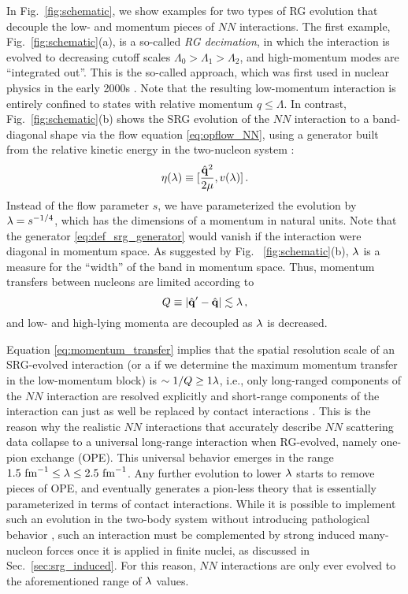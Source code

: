 {In Fig.~\ref{fig:schematic}, we show examples for two types of RG evolution
that decouple the low- and momentum pieces of $NN$ interactions. The first
example, Fig.~\ref{fig:schematic}(a), is a so-called  \emph{RG decimation}, 
in which the interaction is evolved to decreasing cutoff scales $\Lambda_0 > \Lambda_1 > \Lambda_2$, 
and high-momentum modes are ``integrated out''. This is the so-called \Vlowk{}
approach, which was first used in nuclear physics in the early 2000s 
\cite{Bogner:2003os,Bogner:2010pq}. Note that the resulting low-momentum 
interaction is entirely confined to states with relative momentum $q\leq\Lambda$.
In contrast, Fig.~\ref{fig:schematic}(b) shows the SRG evolution of the $NN$ interaction
to a band-diagonal shape via the flow equation \eqref{eq:opflow_NN}, using a 
generator built from the relative kinetic energy in the two-nucleon system \cite{Bogner:2007od,Bogner:2010pq}:
\begin{equation}\label{eq:def_srg_generator}
  \eta(\lambda) \equiv \comm{\frac{\qOV^2}{2\mu}}{v(\lambda)}\,.
\end{equation}
Instead of the flow parameter $s$, we have parameterized the evolution by 
$\lambda=s^{-1/4}$, which has the dimensions of a momentum in natural units. 
Note that the generator \eqref{eq:def_srg_generator} would vanish if the
interaction were diagonal in momentum space. As suggested by Fig.~
\ref{fig:schematic}(b), $\lambda$ is a measure for the ``width'' of the 
band in momentum space. Thus, momentum transfers between nucleons are limited 
according to
\begin{equation}\label{eq:momentum_transfer}
  Q\equiv |\qOV' - \qOV| \lesssim \lambdaSRG\,,
\end{equation} 
and low- and high-lying momenta are decoupled as $\lambda$ is decreased. 

Equation \eqref{eq:momentum_transfer} implies that the spatial resolution scale
of an SRG-evolved interaction (or a \Vlowk{} if we determine the maximum
momentum transfer in the low-momentum block) is $\sim 1/Q \geq 1\lambda$,
i.e., only long-ranged components of the $NN$ interaction are resolved explicitly
and short-range components of the interaction can just as well be replaced 
by contact interactions \cite{Lepage:1997py,Bogner:2003os,Holt:2004ux,Bogner:2010pq}.
This is the reason why the realistic $NN$ interactions that accurately 
describe $NN$ scattering data collapse to a universal long-range interaction
when RG-evolved, namely one-pion exchange (OPE). This universal behavior emerges
in the range $1.5\,\,\text{fm}^{-1}\leq\lambda\leq2.5\,\,\text{fm}^{-1}$. Any further evolution to
lower $\lambda$ starts to remove pieces of OPE, and eventually generates a 
pion-less theory that is essentially parameterized in terms of contact 
interactions. While it is possible to implement such an evolution in
the two-body system without introducing pathological behavior \cite{Wendt:2011ys},
such an interaction must be complemented by strong induced many-nucleon
forces once it is applied in finite nuclei, as discussed in Sec.~\ref{sec:srg_induced}.
For this reason, $NN$ interactions are only ever evolved to the aforementioned
range of $\lambda$ values.

}
